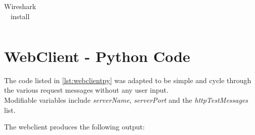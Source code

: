 \documentclass[11pt,a4paper]{report}
\begin{document}
\begin{flushleft}
\begin{center}
\begin{longtable}{ m{5cm} l }
                        \caption{Wireshark install} \label{tab:wireshark}
                    \end{longtable}
                \end{center}
        \end{flushleft}

    \section{WebClient - Python Code}
        \lstset{style=pythoncode}
        
        
        \begin{flushleft}
            The code listed in \ref{lst:webclientpy} was adapted to be simple and cycle through the various request messages without any user input. \\
            Modifiable variables include \textit{serverName}, \textit{serverPort} and the \textit{httpTestMessages} list. \\
        \end{flushleft}

        The webclient produces the following output:
        
\end{document}
